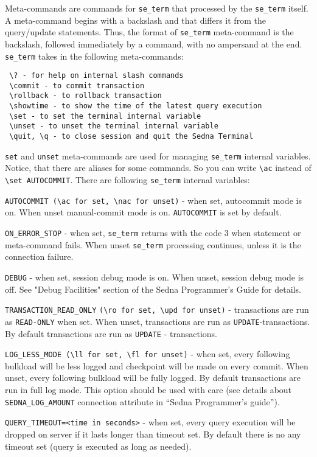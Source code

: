 \documentclass[a4paper,12pt]{article}
\begin{document}
Meta-commands are commands for \verb!se_term! that processed by the
\verb!se_term! itself. A meta-command begins with a backslash and that differs
it from the query/update statements. Thus, the format of \verb!se_term!
meta-command is the backslash, followed immediately by a command, with no
ampersand at the end. \verb!se_term! takes in the following meta-commands:

\small{
\begin{verbatim}
 \? - for help on internal slash commands
 \commit - to commit transaction
 \rollback - to rollback transaction
 \showtime - to show the time of the latest query execution
 \set - to set the terminal internal variable
 \unset - to unset the terminal internal variable
 \quit, \q - to close session and quit the Sedna Terminal
\end{verbatim}}

\verb!set! and \verb!unset! meta-commands are used for managing \verb!se_term!
internal variables. Notice, that there are aliases for some commands. So you can
write \verb!\ac! instead of \verb!\set AUTOCOMMIT!. There are following
\verb!se_term! internal variables:

\verb!AUTOCOMMIT (\ac for set, \nac for unset)! - when set, autocommit mode is
on. When unset manual-commit mode is on. \verb!AUTOCOMMIT! is set by default.

\verb!ON_ERROR_STOP! - when set, \verb!se_term! returns with the code 3 when
statement or meta-command fails. When unset \verb!se_term! processing continues,
unless it is the connection failure.

\verb!DEBUG! - when set, session debug mode is on. When unset, session debug
mode is off. See "Debug Facilities" section of the Sedna Programmer's Guide for
details.

\verb!TRANSACTION_READ_ONLY! \verb!(\ro for set, \upd for unset)! - transactions
are run as \verb!READ-ONLY! when set. When unset, transactions are run as
\verb!UPDATE!-transactions. By default transactions are run as \verb!UPDATE! - 
transactions.

\verb!LOG_LESS_MODE (\ll for set, \fl for unset)! - when set, every following
bulkload will be less logged and checkpoint will be made on every commit. When
unset, every following bulkload will be fully logged. By default transactions
are run in full log mode. This option should be used with care (see details
about \verb!SEDNA_LOG_AMOUNT! connection attribute in ``Sedna Programmer's
guide'').

\verb!QUERY_TIMEOUT=<time in seconds>! - when set, every query execution will be
dropped on server if it lasts longer than timeout set. By default there is no
any timeout set (query is executed as long as needed).
\end{document}
